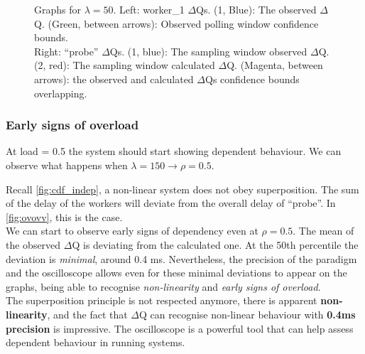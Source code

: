 \begin{figure}[H]
\begin{subfigure}{.5\textwidth}
                \label{fig:norm_ex_2}
            \end{subfigure}
            \caption{Graphs for $\lambda = 50$. Left: worker\_1 $\Delta$Qs. (1, Blue): The observed $\Delta$Q. (Green, between arrows): Observed polling window confidence bounds. \\
            Right: ``probe'' $\Delta$Qs. (1, blue): The sampling window observed $\Delta$Q. (2, red): The sampling window calculated $\Delta$Q. (Magenta, between arrows): the observed and calculated $\Delta$Qs confidence bounds overlapping.}
            \label{fig:norm_ex}
        \end{figure}
    
\subsubsection{Early signs of overload}
    
    At load = 0.5 the system should start showing dependent behaviour. We can observe what happens when $\lambda = 150 \rightarrow \rho = 0.5$.
    
    Recall \ref{fig:cdf_indep}, a non-linear system does not obey superposition. The sum of the delay of the workers will deviate from the overall delay of ``probe''. In \cref{fig:ovovv}, this is the case. \\
    We can start to observe early signs of dependency even at $\rho = 0.5$. The mean of the observed $\Delta$Q is deviating from the calculated one. At the 50th percentile the deviation is \textit{minimal}, around 0.4 ms. Nevertheless, the precision of the paradigm and the oscilloscope allows even for these minimal deviations to appear on the graphs, being able to recognise \textit{non-linearity} and \textit{early signs of overload}. \\
    The superposition principle is not respected anymore, there is apparent \textbf{non-linearity}, and the fact that $\Delta$Q can recognise non-linear behaviour with \textbf{0.4ms precision} is impressive. The oscilloscope is a powerful tool that can help assess dependent behaviour in running systems.
 
